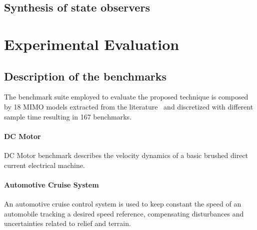 \documentclass[twocolumn]{autart}    %
\begin{document}
\subsection{Synthesis of state observers}
\label{ssec:sobsvcegis}

\section{Experimental Evaluation}
\label{exp:evaluation}

\subsection{Description of the benchmarks}
\label{exp:benchmarks}


The benchmark suite employed to evaluate the proposed technique is 
composed by 18 MIMO models extracted from the literature~\cite{acrobot,cstr,CHEN1979389,KOKOTOVIC198023,gajic2008optimal,Franklin15, maglev, converters, CTMS} and discretized with different sample time
resulting in 167 benchmarks. 

\paragraph*{DC Motor}

DC Motor benchmark describes the velocity dynamics of a basic 
brushed direct current electrical machine.

\paragraph*{Automotive Cruise System}

An automotive cruise control system is used to keep constant the speed 
of an automobile  tracking a desired speed reference, compensating 
disturbances and uncertainties related to relief and terrain.
\end{document}
